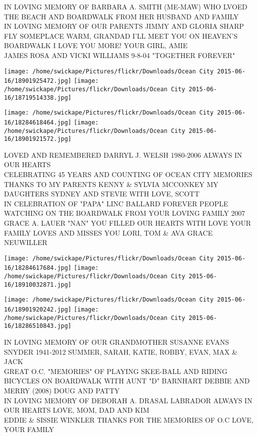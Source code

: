 \documentclass[10pt,letterpaper]{article}
\begin{document}
IN LOVING MEMORY OF BARBARA A. SMITH (ME{-}MAW) WHO LVOED THE BEACH AND BOARDWALK FROM HER HUSBAND AND FAMILY\\
IN LOVING MEMORY OF OUR PARENTS JIMMY AND GLORIA SHARP\\
FLY SOMEPLACE WARM, GRANDAD I'LL MEET YOU ON HEAVEN'S BOARDWALK I LOVE YOU MORE!  YOUR GIRL, AMIE\\
JAMES ROSA AND VICKI WILLIAMS 9{-}8{-}04 "TOGETHER FOREVER"
\pagebreak

\texttt{[image: /home/swickape/Pictures/flickr/Downloads/Ocean City 2015-06-16/18901925472.jpg]}
\texttt{[image: /home/swickape/Pictures/flickr/Downloads/Ocean City 2015-06-16/18719514338.jpg]}

\texttt{[image: /home/swickape/Pictures/flickr/Downloads/Ocean City 2015-06-16/18284618464.jpg]}
\texttt{[image: /home/swickape/Pictures/flickr/Downloads/Ocean City 2015-06-16/18901921572.jpg]}

LOVED AND REMEMBERED DARRYL J. WELSH 1980{-}2006 ALWAYS IN OUR HEARTS\\
CELEBRATING 45 YEARS AND COUNTING OF OCEAN CITY MEMORIES THANKS TO MY PARENTS KENNY \& SYLVIA MCCONKEY MY DAUGHTERS SYDNEY AND STEVIE WITH LOVE, SCOTT\\
IN CELEBRATION OF "PAPA" LINC BALLARD FOREVER PEOPLE WATCHING ON THE BOARDWALK FROM YOUR LOVING FAMILY 2007\\
GRACE A. LAUER "NAN" YOU FILLED OUR HEARTS WITH LOVE YOUR FAMILY LOVES AND MISSES YOU LORI, TOM \& AVA GRACE NEUWILLER
\pagebreak

\texttt{[image: /home/swickape/Pictures/flickr/Downloads/Ocean City 2015-06-16/18284617684.jpg]}
\texttt{[image: /home/swickape/Pictures/flickr/Downloads/Ocean City 2015-06-16/18910032871.jpg]}

\texttt{[image: /home/swickape/Pictures/flickr/Downloads/Ocean City 2015-06-16/18901920242.jpg]}
\texttt{[image: /home/swickape/Pictures/flickr/Downloads/Ocean City 2015-06-16/18286510843.jpg]}

IN LOVING MEMORY OF OUR GRANDMOTHER SUSANNE EVANS SNYDER 1941{-}2012 SUMMER, SARAH, KATIE, ROBBY, EVAN, MAX \& JACK\\
GREAT O.C. "MEMORIES" OF PLAYING SKEE{-}BALL AND RIDING BICYCLES ON BOARDWALK WITH AUNT "D" BARNHART DEBBIE AND MERRY (2008) DOUG AND PATTY\\
IN LOVING MEMORY OF DEBORAH A. DRASAL LABRADOR ALWAYS IN OUR HEARTS LOVE, MOM, DAD AND KIM\\
EDDIE \& SISSIE WINKLER THANKS FOR THE MEMORIES OF O.C LOVE, YOUR FAMILY
\pagebreak
\end{document}
